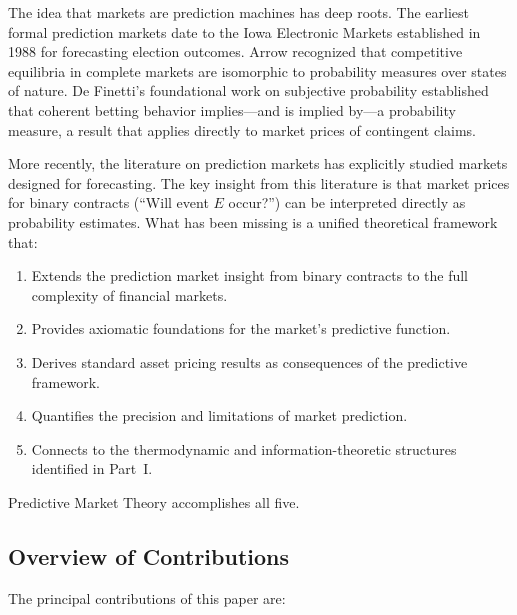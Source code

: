 \documentclass[12pt,a4paper]{article}
\theoremstyle{definition}
\begin{document}
The idea that markets are prediction machines has deep roots. The earliest formal prediction markets date to the Iowa Electronic Markets established in 1988 for forecasting election outcomes. Arrow \citep{arrow1964} recognized that competitive equilibria in complete markets are isomorphic to probability measures over states of nature. De Finetti's foundational work on subjective probability \citep{definetti1937} established that coherent betting behavior implies---and is implied by---a probability measure, a result that applies directly to market prices of contingent claims.

More recently, the literature on prediction markets \citep{wolfers2004,hanson2003,arrow2008} has explicitly studied markets designed for forecasting. The key insight from this literature is that market prices for binary contracts (``Will event $E$ occur?'') can be interpreted directly as probability estimates. What has been missing is a unified theoretical framework that:

\begin{enumerate}[label=(\roman*)]
    \item Extends the prediction market insight from binary contracts to the full complexity of financial markets.
    \item Provides axiomatic foundations for the market's predictive function.
    \item Derives standard asset pricing results as consequences of the predictive framework.
    \item Quantifies the precision and limitations of market prediction.
    \item Connects to the thermodynamic and information-theoretic structures identified in Part~I.
\end{enumerate}

Predictive Market Theory accomplishes all five.

\subsection{Overview of Contributions}

The principal contributions of this paper are:
\end{document}
